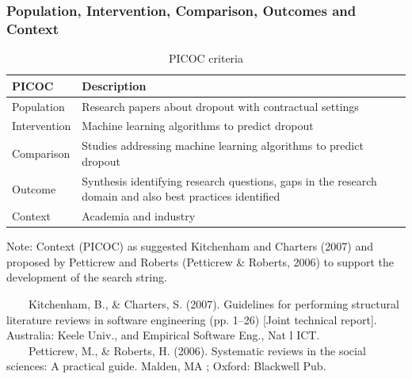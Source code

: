 \documentclass[10pt]{beamer}
\begin{document}
\begin{frame}
	\frametitle{Population, Intervention, Comparison, Outcomes and Context}
	\begin{center}
		\begin{table}
		  \centering
		  \scriptsize
		  \caption{PICOC criteria}
		    \begin{tabular}{p{3cm} p{5cm}}
		    \toprule
		    PICOC & Description\\
		    \midrule
			Population & Research papers about dropout with contractual settings \\ \hline
			Intervention &  Machine learning algorithms to predict dropout	\\ \hline	
			Comparison & Studies addressing machine learning algorithms to predict dropout \\ \hline 
			Outcome & Synthesis identifying research questions, gaps in the research domain and also best practices identified \\ \hline
			Context & Academia and industry\\
		\bottomrule
		\end{tabular}
		\label{Abordagens analisadas}
		\begin{flushleft}
			Note: Context (PICOC) as suggested Kitchenham and Charters (2007) and proposed by Petticrew and Roberts (Petticrew \& Roberts, 2006) to support the development of the search string.
		\end{flushleft}
		\end{table}
	\end{center}
	\tiny 
	~~~~Kitchenham, B., \& Charters, S. (2007). Guidelines for performing structural literature reviews in software engineering (pp. 1–26) [Joint technical report]. Australia: Keele Univ., and Empirical Software Eng., Nat l ICT.\\
	~~~~Petticrew, M., \& Roberts, H. (2006). Systematic reviews in the social sciences: A practical guide. Malden, MA ; Oxford: Blackwell Pub.\\
\end{frame}
\end{document}
